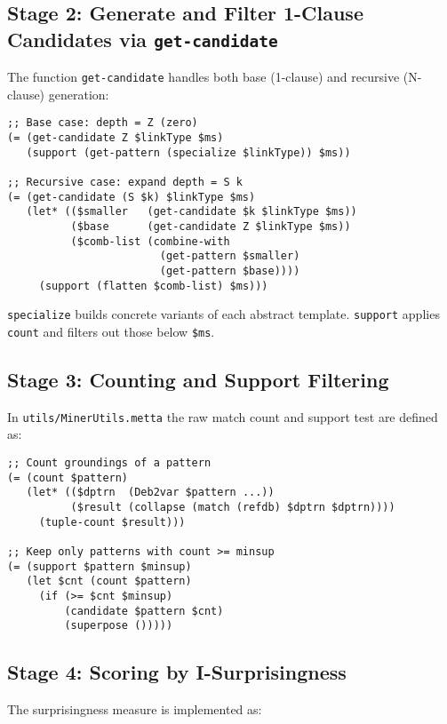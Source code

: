 \subsection{Stage 2: Generate and Filter 1-Clause Candidates via \texttt{get-candidate}}

The function \texttt{get-candidate} handles both base (1-clause) and recursive (N-clause) generation:

\begin{verbatim}
;; Base case: depth = Z (zero)
(= (get-candidate Z $linkType $ms)
   (support (get-pattern (specialize $linkType)) $ms))

;; Recursive case: expand depth = S k
(= (get-candidate (S $k) $linkType $ms)
   (let* (($smaller   (get-candidate $k $linkType $ms))
          ($base      (get-candidate Z $linkType $ms))
          ($comb-list (combine-with
                        (get-pattern $smaller)
                        (get-pattern $base))))
     (support (flatten $comb-list) $ms)))
\end{verbatim}

\noindent
\texttt{specialize} builds concrete variants of each abstract template.  \texttt{support} applies \texttt{count} and filters out those below \texttt{\$ms}.

\subsection{Stage 3: Counting and Support Filtering}

In \texttt{utils/MinerUtils.metta} the raw match count and support test are defined as:

\begin{verbatim}
;; Count groundings of a pattern
(= (count $pattern)
   (let* (($dptrn  (Deb2var $pattern ...))
          ($result (collapse (match (refdb) $dptrn $dptrn))))
     (tuple-count $result)))

;; Keep only patterns with count >= minsup
(= (support $pattern $minsup)
   (let $cnt (count $pattern)
     (if (>= $cnt $minsup)
         (candidate $pattern $cnt)
         (superpose ()))))
\end{verbatim}

\subsection{Stage 4: Scoring by I-Surprisingness}

The surprisingness measure is implemented as:

